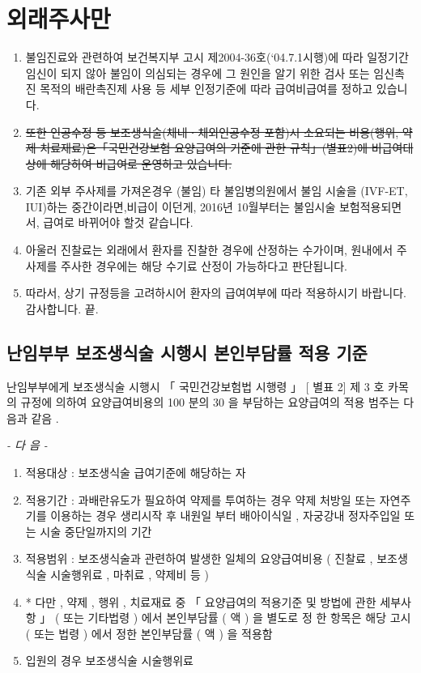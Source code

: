 \section{외래주사만}
%
{\begin{enumerate}\tightlist
\item 불임진료와 관련하여 보건복지부 고시 제2004-36호(‘04.7.1시행)에 따라 일정기간 임신이 되지 않아 불임이 의심되는 경우에 그 원인을 알기 위한 검사 또는 임신촉진 목적의 배란촉진제 사용 등 세부 인정기준에 따라 급여\bullet 비급여를 정하고 있습니다.
\item \sout{또한 인공수정 등 보조생식술(체내ㆍ체외인공수정 포함)시 소요되는 비용(행위, 약제 치료재료)은「국민건강보험 요양급여의 기준에 관한 규칙」(별표2)에 비급여대상에 해당하여 비급여로 운영하고 있습니다.}
\item 기존 외부 주사제를 가져온경우 (불임) 타 불임병의원에서 불임 시술을 (IVF-ET, IUI)하는 중간이라면,비급이  이던게, 2016년 10월부터는 불임시술 보험적용되면서, 급여로 바뀌어야 할것 같습니다.
\item 아울러 진찰료는 외래에서 환자를 진찰한 경우에 산정하는 수가이며, 원내에서 주사제를 주사한 경우에는 해당 수기료 산정이 가능하다고 판단됩니다.
\item 따라서, 상기 규정등을 고려하시어 환자의 급여여부에 따라 적용하시기 바랍니다. 감사합니다. 끝.
\end{enumerate}
}
\subsection{난임부부 보조생식술 시행시 본인부담률 적용 기준}
난임부부에게 보조생식술 시행시 「 국민건강보험법 시행령 」 [ 별표 2] 제 3 호 카목의 규정에 의하여 요양급여비용의 100 분의 30 을 부담하는 요양급여의 적용 범주는 다음과 같음 .\par
\emph{- 다 음 -}\par
\begin{enumerate}[가.]\tightlist
\item 적용대상 : 보조생식술 급여기준에 해당하는 자
\item 적용기간 : 과배란유도가 필요하여 약제를 투여하는 경우 약제 처방일 또는 자연주기를 이용하는 경우 생리시작 후 내원일 부터 배아이식일 , 자궁강내 정자주입일 또는 시술 중단일까지의 기간
\item 적용범위 : 보조생식술과 관련하여 발생한 일체의 요양급여비용 ( 진찰료 , 보조생식술 시술행위료 , 마취료 , 약제비 등 )
\item * 다만 , 약제 , 행위 , 치료재료 중 「 요양급여의 적용기준 및 방법에 관한 세부사항 」 ( 또는 기타법령 ) 에서 본인부담률 ( 액 ) 을 별도로 정 한 항목은 해당 고시 ( 또는 법령 ) 에서 정한 본인부담률 ( 액 ) 을 적용함
\item 입원의 경우 보조생식술 시술행위료
\end{enumerate}

